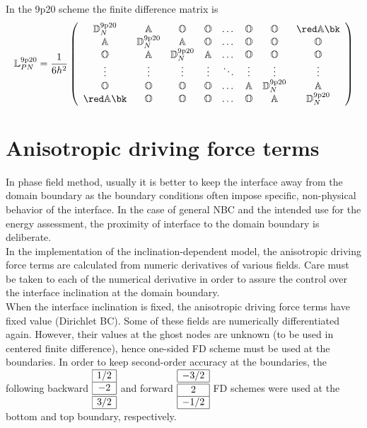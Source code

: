 In the 9p20 scheme the finite difference matrix is
\begin{equation}
	\mathbb{L}^{\mathrm{9p20}}_{PN} = \frac{1}{6h^2}\left(\begin{array}{cccccccccc}
		\mathbb{D}^\mathrm{9p20}_N & \mathbb{A} & \mathbb{O}&\mathbb{O}& \dots&\mathbb{O}&\mathbb{O} &\red \mathbb{A}\bk\\
		\mathbb{A}&\mathbb{D}^\mathrm{9p20}_N & \mathbb{A} & \mathbb{O}& \dots&\mathbb{O}&\mathbb{O}&\mathbb{O}\\
		\mathbb{O}&\mathbb{A}&\mathbb{D}^\mathrm{9p20}_N & \mathbb{A} &  \dots&\mathbb{O}&\mathbb{O}&\mathbb{O}\\
		\vdots&\vdots&\vdots&\vdots&\ddots &\vdots&\vdots&\vdots\\
		\mathbb{O}&\mathbb{O}&\mathbb{O}&\mathbb{O}&\dots &\mathbb{A}&\mathbb{D}^\mathrm{9p20}_N & \mathbb{A} \\
		\red \mathbb{A}\bk&\mathbb{O}&\mathbb{O}&\mathbb{O}&\dots &\mathbb{O}&\mathbb{A}&\mathbb{D}^\mathrm{9p20}_N
	\end{array}\right)
\end{equation}

\section*{Anisotropic driving force terms}
In phase field method, usually it is better to keep the interface away from the domain boundary as the boundary conditions often impose specific, non-physical behavior of the interface.  In the case of general NBC and the intended use for the energy assessment, the proximity of interface to the domain boundary is deliberate.\\
In the implementation of the inclination-dependent model, the anisotropic driving force terms are calculated from numeric derivatives of various fields. Care must be taken to each of the numerical derivative in order to assure the control over the interface inclination at the domain boundary. \\
When the interface inclination is fixed, the anisotropic driving force terms have fixed value (Dirichlet BC). Some of these fields are numerically differentiated again. However, their values at the ghost nodes are unknown (to be used in centered finite difference), hence one-sided FD scheme must be used at the boundaries. In order to keep second-order accuracy at the boundaries, the following backward $\begin{array}{|c|}
	\hline 1/2 \\ \hline -2 \\ \hline\hline 3/2 \\ \hline
\end{array}$ and forward $\begin{array}{|c|}
	\hline -3/2 \\ \hline\hline 2 \\ \hline -1/2 \\ \hline
\end{array}$ FD schemes were used at the bottom and top boundary, respectively.

